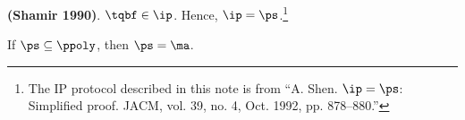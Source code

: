 \documentclass[11pt, a4paper]{article}
\begin{document}
\begin{theorem}
{\bf (Shamir 1990)}.
$\tqbf \in \ip$.
Hence, $\ip=\ps$.\footnote{The IP protocol described in this note is from ``A. Shen. $\ip=\ps$: Simplified proof. JACM, vol. 39, no. 4, Oct. 1992, pp. 878--880.''}
\end{theorem}

\begin{theorem}
If $\ps \subseteq \ppoly$, then $\ps =\ma$.
\end{theorem}
\end{document}
